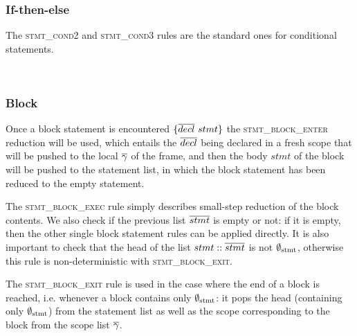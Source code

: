 \documentclass[UTF8]{article}
\begin{document}
\begin{figure}[ht!]
    \ottusedrule{\ottdrulestmtXXassXXv{}}
\end{figure}

\subsubsection*{If-then-else}
The \textsc{stmt\_cond2} and \textsc{stmt\_cond3} rules are the standard ones for conditional statements.

\begin{figure}[ht!]
    \ottusedrule{\ottdrulestmtXXcondTwo{}} \\
    \ottusedrule{\ottdrulestmtXXcondThree{}} 
\end{figure}


\subsubsection*{Block}
Once a block statement is encountered $ \{ \overline{decl} \ stmt \}$ the \textsc{stmt\_block\_enter} reduction will be used, which entails the $\overline{decl}{}$ being declared in a fresh scope that will be pushed to the local $\overline{\gamma}{}$ of the frame, and then the body $stmt$ of the block will be pushed to the statement list, in which the block statement has been reduced to the empty statement.

The \textsc{stmt\_block\_exec} rule simply describes small-step reduction of the block contents. We also check if the previous list $\overline{stmt}$ is empty or not: if it is empty, then the other single block statement rules can be applied directly. It is also important to check that the head of the list $stmt::\overline{stmt}$ is not $\emptyset_{ \mathrm{stmt} }{}$, otherwise this rule is non-deterministic with \textsc{stmt\_block\_exit}.

The \textsc{stmt\_block\_exit} rule is used in the case where the end of a block is reached, i.e. whenever a block contains only $\emptyset_{ \mathrm{stmt} }{}$: it pops the head (containing only $\emptyset_{ \mathrm{stmt} }{}$) from the statement list as well as the scope corresponding to the block from the scope list $\overline{\gamma}$.

\begin{figure}[ht!]
    \ottusedrule{\ottdrulestmtXXblockXXenter{}} \\
    \ottusedrule{\ottdrulestmtXXblockXXexec{}} \\
    \ottusedrule{\ottdrulestmtXXblockXXexit{}} 
\end{figure}
\end{document}

